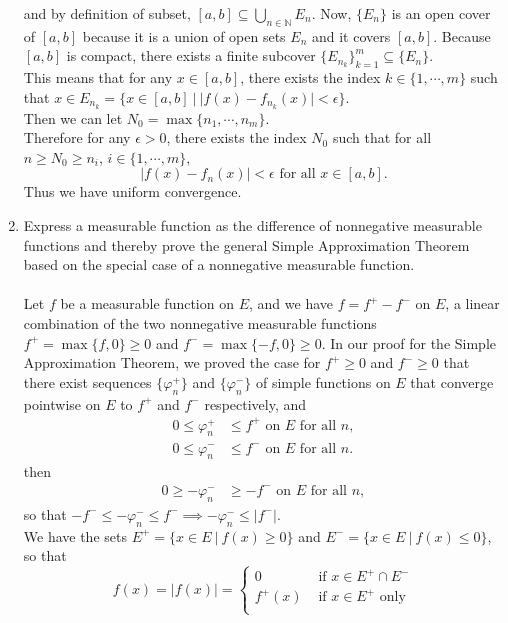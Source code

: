 \begin{enumerate}
\[    \]
    and by definition of subset, $[a,b]\subseteq \bigcup_{n\in\mathbb{N}} E_n$.
    Now, $\{E_n\}$ is an open cover of $[a,b]$ because it is a union of open sets $E_n$ and it covers $[a,b]$.
    Because $[a,b]$ is compact, there exists a finite subcover $\{E_{n_k}\}_{k=1}^m\subseteq\{E_n\}$. 
    \\This means that for any $x\in[a,b]$, there exists the index $k\in\{1,\cdots,m\}$ such that $x\in E_{n_k}=\{x\in[a,b]\ |\ |f(x)-f_{n_k}(x)|<\epsilon\}$.
    \\Then we can let $N_0=\max\{n_1,\cdots,n_m\}$.
    \\Therefore for any $\epsilon>0$, there exists the index $N_0$ such that for all $n\ge N_0\ge n_i$, $i\in\{1,\cdots,m\}$,
    \[
        |f(x)-f_n(x)|<\epsilon\text{ for all }x\in[a,b].
    \]
    Thus we have uniform convergence.
    \item Express a measurable function as the difference of nonnegative measurable functions and thereby prove the general Simple Approximation Theorem based on the special case of a nonnegative measurable function.\\
    \\Let $f$ be a measurable function on $E$, and we have $f=f^+-f^-$ on $E$, a linear combination of the two nonnegative measurable functions $f^+=\max\{f,0\}\ge0$ and $f^-=\max\{-f,0\}\ge0$.
    In our proof for the Simple Approximation Theorem, we proved the case for $f^+\ge0$ and $f^-\ge0$ that there exist sequences $\{\varphi^+_n\}$ and $\{\varphi^-_n\}$ of simple functions on $E$ that converge pointwise on $E$ to $f^+$ and $f^-$ respectively, and 
    \begin{align*}
        0\le\varphi^+_n&\le f^+\text{ on }E\text{ for all }n,\\
        0\le\varphi^-_n&\le f^-\text{ on }E\text{ for all }n.
    \end{align*}
    then
    \begin{align*}
        0\ge-\varphi^-_n&\ge -f^-\text{ on }E\text{ for all }n,
    \end{align*}
    so that $-f^-\le-\varphi^-_n\le f^-\implies -\varphi^-_n \le |f^-|$.
    \\We have the sets $E^+=\{x\in E\ |\ f(x)\ge0\}$ and $E^-=\{x\in E\ |\ f(x)\le0\}$, so that
    \[
        f(x)=|f(x)|=
        \begin{cases}
            0&\text{ if }x\in E^+\cap E^-\\
            f^+(x)&\text{ if }x\in E^+\text{ only}\\

\end{cases}\]
\end{enumerate}
